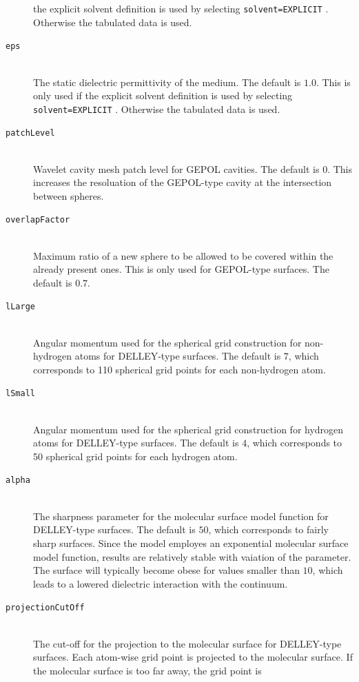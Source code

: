 \documentclass[bibliography=totocnumbered,a4paper,10pt,oneside]{scrbook}
\newcommand{\ttt}[1]{%
  \begingroup\setlength{\fboxsep}{1pt}%
  \colorbox{serenity-green!30}{\texttt{\hspace*{2pt}\vphantom{(g}#1\hspace*{2pt}}}%
  \endgroup
}
\begin{document}
\begin{description}
    the explicit solvent definition is used by selecting \ttt{solvent=EXPLICIT}. Otherwise the tabulated
    data is used.
    \item [\texttt{eps}]\hfill \\
    The static dielectric permittivity of the medium. The default is $1.0$. This is only used if 
    the explicit solvent definition is used by selecting \ttt{solvent=EXPLICIT}. Otherwise the tabulated
    data is used.  
    \item [\texttt{patchLevel}]\hfill \\
    Wavelet cavity mesh patch level for GEPOL cavities. The default is $0$. This increases the resoluation of the 
    GEPOL-type cavity at the intersection between spheres.
    \item [\texttt{overlapFactor}]\hfill \\
    Maximum ratio of a new sphere to be allowed to be covered within the already present ones. This is only used for 
    GEPOL-type surfaces. The default is $0.7$.  
    \item [\texttt{lLarge}]\hfill \\
    Angular momentum used for the spherical grid construction for non-hydrogen atoms for DELLEY-type surfaces. The default
    is $7$, which corresponds to 110 spherical grid points for each  non-hydrogen atom.
    \item [\texttt{lSmall}]\hfill \\
    Angular momentum used for the spherical grid construction for hydrogen atoms for DELLEY-type surfaces. The default
    is $4$, which corresponds to 50 spherical grid points for each hydrogen atom.
    \item [\texttt{alpha}]\hfill \\
    The sharpness parameter for the molecular surface model function for DELLEY-type surfaces. The default
    is $50$, which corresponds to fairly sharp surfaces. Since the model employes an exponential 
    molecular surface model function, results are relatively stable with vaiation of the parameter. The surface 
    will typically become obese for values smaller than $10$, which leads to a lowered dielectric interaction with 
    the continuum.
    \item [\texttt{projectionCutOff}]\hfill \\
    The cut-off for the projection to the molecular surface for DELLEY-type surfaces. Each atom-wise grid 
    point is projected to the molecular surface. If the molecular surface is too far away, the grid point is 

\end{description}
\end{document}

